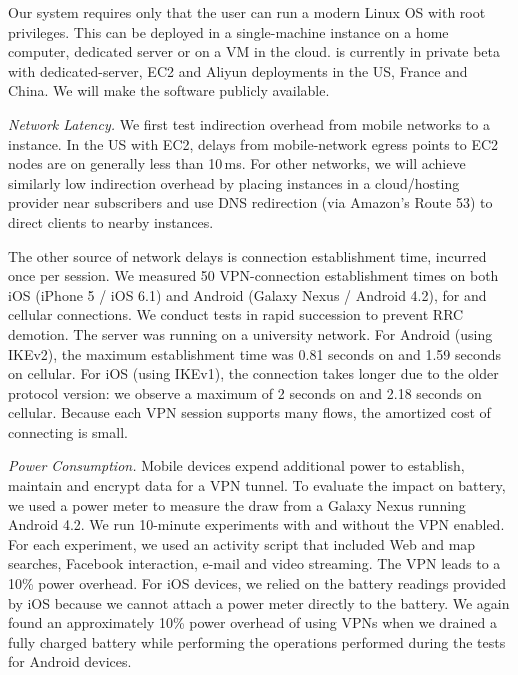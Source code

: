 Our \meddlebox system requires only that the user can run a modern Linux OS with root privileges. This can be deployed 
in a single-machine instance on a home computer, dedicated server or on a VM in the cloud. \meddle is currently in private beta with dedicated-server, EC2 and Aliyun deployments in the US, France and China. We will make the \meddle software publicly available.

\noindent\emph{Network Latency.}
We first test indirection overhead from mobile networks to a \meddle instance. In the 
US with EC2, delays from mobile-network egress points to EC2 nodes are on generally less than 10\,ms. 
For other networks, we will achieve similarly low indirection overhead by placing instances in a cloud/hosting 
provider near subscribers and use DNS redirection (\eg via Amazon's Route 53) to direct clients to nearby instances. 

The other source of network delays is connection establishment time, incurred once per session. We measured 
50 VPN-connection establishment times on both iOS (iPhone 5 / iOS 6.1) and Android (Galaxy Nexus /
Android 4.2), for \wifi{} and cellular connections. We conduct tests in rapid succession to prevent RRC demotion.
The \meddle server was running on a university network. 
For Android (using IKEv2), the maximum establishment time was 0.81 seconds on \wifi{} and 1.59 seconds on cellular. 
For iOS (using IKEv1), the connection takes longer due to the older protocol version: we observe a maximum of 2 seconds on \wifi{} and 2.18 seconds on cellular. 
Because each VPN session supports many flows, the amortized cost of connecting is  small. 

\noindent\emph{Power Consumption.}
Mobile devices expend additional power to establish, maintain and encrypt data for a VPN tunnel. 
To evaluate the impact on battery, we used a power meter to measure the draw from a Galaxy Nexus running Android 4.2. 
We run 10-minute experiments with and without the VPN enabled. 
For each experiment, we used an activity script that included Web and map searches, Facebook interaction, e-mail and video
streaming. 
The VPN leads to a 10\% power overhead. 
For iOS devices, we relied on the battery readings provided by iOS because we cannot attach a power meter directly to the battery.
We again found an approximately 10\% power overhead of using VPNs when we drained a fully charged battery while performing the operations performed during the tests for Android devices.  

